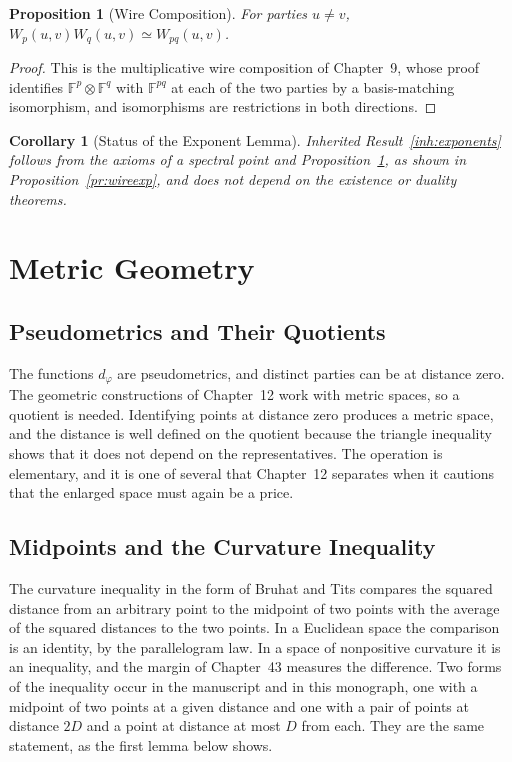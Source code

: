 \documentclass[11pt,letterpaper]{report}
\theoremstyle{plain}
\newtheorem{proposition}[theorem]{Proposition}
\newtheorem{corollary}[theorem]{Corollary}
\theoremstyle{definition}
\theoremstyle{remark}
\begin{document}
\begin{proposition}[Wire Composition]\label{pr:wirecomp}
For parties $u\ne v$, $W_p(u,v)W_q(u,v)\simeq W_{pq}(u,v)$.
\end{proposition}
\begin{proof}
This is the multiplicative wire composition of Chapter~9, whose proof identifies $\mathbb F^p\otimes\mathbb F^q$ with $\mathbb F^{pq}$ at each of the two parties by a basis-matching isomorphism, and isomorphisms are restrictions in both directions.
\end{proof}

\begin{corollary}[Status of the Exponent Lemma]\label{co:exponentstatus}
Inherited Result~\ref{inh:exponents} follows from the axioms of a spectral point and Proposition~\ref{pr:wirecomp}, as shown in Proposition~\ref{pr:wireexp}, and does not depend on the existence or duality theorems.
\end{corollary}

\chapter{Metric Geometry}

\section{Pseudometrics and Their Quotients}

The functions $d_\varphi$ are pseudometrics, and distinct parties can be at distance zero. The geometric constructions of Chapter~12 work with metric spaces, so a quotient is needed. Identifying points at distance zero produces a metric space, and the distance is well defined on the quotient because the triangle inequality shows that it does not depend on the representatives. The operation is elementary, and it is one of several that Chapter~12 separates when it cautions that the enlarged space must again be a price.

\section{Midpoints and the Curvature Inequality}

The curvature inequality in the form of Bruhat and Tits compares the squared distance from an arbitrary point to the midpoint of two points with the average of the squared distances to the two points. In a Euclidean space the comparison is an identity, by the parallelogram law. In a space of nonpositive curvature it is an inequality, and the margin of Chapter~43 measures the difference. Two forms of the inequality occur in the manuscript and in this monograph, one with a midpoint of two points at a given distance and one with a pair of points at distance $2D$ and a point at distance at most $D$ from each. They are the same statement, as the first lemma below shows.
\end{document}
